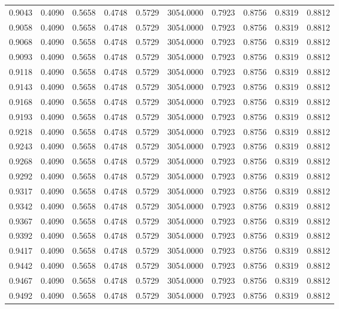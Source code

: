 \begin{tabular}{rrrrrrrrrr}
0.9043 & 0.4090 & 0.5658 & 0.4748 & 0.5729 & 3054.0000 & 0.7923 & 0.8756 & 0.8319 & 0.8812 \\
0.9058 & 0.4090 & 0.5658 & 0.4748 & 0.5729 & 3054.0000 & 0.7923 & 0.8756 & 0.8319 & 0.8812 \\
0.9068 & 0.4090 & 0.5658 & 0.4748 & 0.5729 & 3054.0000 & 0.7923 & 0.8756 & 0.8319 & 0.8812 \\
0.9093 & 0.4090 & 0.5658 & 0.4748 & 0.5729 & 3054.0000 & 0.7923 & 0.8756 & 0.8319 & 0.8812 \\
0.9118 & 0.4090 & 0.5658 & 0.4748 & 0.5729 & 3054.0000 & 0.7923 & 0.8756 & 0.8319 & 0.8812 \\
0.9143 & 0.4090 & 0.5658 & 0.4748 & 0.5729 & 3054.0000 & 0.7923 & 0.8756 & 0.8319 & 0.8812 \\
0.9168 & 0.4090 & 0.5658 & 0.4748 & 0.5729 & 3054.0000 & 0.7923 & 0.8756 & 0.8319 & 0.8812 \\
0.9193 & 0.4090 & 0.5658 & 0.4748 & 0.5729 & 3054.0000 & 0.7923 & 0.8756 & 0.8319 & 0.8812 \\
0.9218 & 0.4090 & 0.5658 & 0.4748 & 0.5729 & 3054.0000 & 0.7923 & 0.8756 & 0.8319 & 0.8812 \\
0.9243 & 0.4090 & 0.5658 & 0.4748 & 0.5729 & 3054.0000 & 0.7923 & 0.8756 & 0.8319 & 0.8812 \\
0.9268 & 0.4090 & 0.5658 & 0.4748 & 0.5729 & 3054.0000 & 0.7923 & 0.8756 & 0.8319 & 0.8812 \\
0.9292 & 0.4090 & 0.5658 & 0.4748 & 0.5729 & 3054.0000 & 0.7923 & 0.8756 & 0.8319 & 0.8812 \\
0.9317 & 0.4090 & 0.5658 & 0.4748 & 0.5729 & 3054.0000 & 0.7923 & 0.8756 & 0.8319 & 0.8812 \\
0.9342 & 0.4090 & 0.5658 & 0.4748 & 0.5729 & 3054.0000 & 0.7923 & 0.8756 & 0.8319 & 0.8812 \\
0.9367 & 0.4090 & 0.5658 & 0.4748 & 0.5729 & 3054.0000 & 0.7923 & 0.8756 & 0.8319 & 0.8812 \\
0.9392 & 0.4090 & 0.5658 & 0.4748 & 0.5729 & 3054.0000 & 0.7923 & 0.8756 & 0.8319 & 0.8812 \\
0.9417 & 0.4090 & 0.5658 & 0.4748 & 0.5729 & 3054.0000 & 0.7923 & 0.8756 & 0.8319 & 0.8812 \\
0.9442 & 0.4090 & 0.5658 & 0.4748 & 0.5729 & 3054.0000 & 0.7923 & 0.8756 & 0.8319 & 0.8812 \\
0.9467 & 0.4090 & 0.5658 & 0.4748 & 0.5729 & 3054.0000 & 0.7923 & 0.8756 & 0.8319 & 0.8812 \\
0.9492 & 0.4090 & 0.5658 & 0.4748 & 0.5729 & 3054.0000 & 0.7923 & 0.8756 & 0.8319 & 0.8812 \\

\end{tabular}
